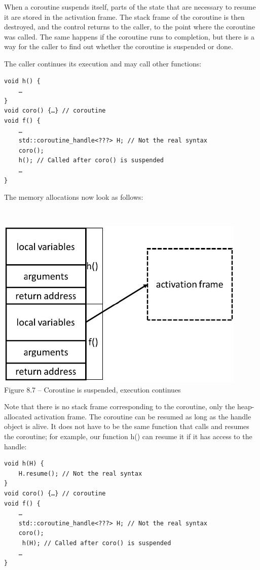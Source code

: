 When a coroutine suspends itself, parts of the state that are necessary to resume it are stored in the activation frame. The stack frame of the coroutine is then destroyed, and the control returns to the caller, to the point where the coroutine was called. The same happens if the coroutine runs to completion, but there is a way for the caller to find out whether the coroutine is suspended or done.

The caller continues its execution and may call other functions:

\begin{lstlisting}[style=styleCXX]
void h() {
	…
}
void coro() {…} // coroutine
void f() {
	…
	std::coroutine_handle<???> H; // Not the real syntax
	coro();
	h(); // Called after coro() is suspended
	…
}
\end{lstlisting}

The memory allocations now look as follows:

\hspace*{\fill} \\ %
\begin{center}
\includegraphics[width=0.9\textwidth]{content/2/chapter8/images/7.jpg}\\
Figure 8.7 – Coroutine is suspended, execution continues
\end{center}

Note that there is no stack frame corresponding to the coroutine, only the heap-allocated activation frame. The coroutine can be resumed as long as the handle object is alive. It does not have to be the same function that calls and resumes the coroutine; for example,  our function h() can resume it if it has access to the handle:

\begin{lstlisting}[style=styleCXX]
void h(H) {
	H.resume(); // Not the real syntax
}
void coro() {…} // coroutine
void f() {
	…
	std::coroutine_handle<???> H; // Not the real syntax
	coro();
	 h(H); // Called after coro() is suspended
	…
}
\end{lstlisting}

